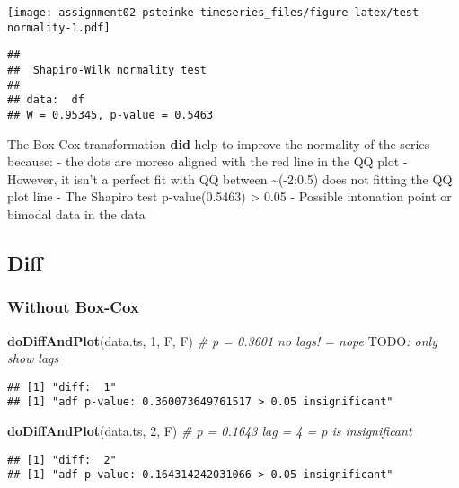 \documentclass[]{article}
\newenvironment{Shaded}{\begin{snugshade}}{\end{snugshade}}
\newcommand{\AlertTok}[1]{\textcolor[rgb]{0.94,0.16,0.16}{#1}}
\newcommand{\CommentTok}[1]{\textcolor[rgb]{0.56,0.35,0.01}{\textit{#1}}}
\newcommand{\DecValTok}[1]{\textcolor[rgb]{0.00,0.00,0.81}{#1}}
\newcommand{\KeywordTok}[1]{\textcolor[rgb]{0.13,0.29,0.53}{\textbf{#1}}}
\newcommand{\NormalTok}[1]{#1}
\begin{document}
\texttt{[image: assignment02-psteinke-timeseries\_files/figure-latex/test-normality-1.pdf]}

\begin{verbatim}
## 
##  Shapiro-Wilk normality test
## 
## data:  df
## W = 0.95345, p-value = 0.5463
\end{verbatim}

The Box-Cox transformation \textbf{did} help to improve the normality of
the series because: - the dots are moreso aligned with the red line in
the QQ plot - However, it isn't a perfect fit with QQ between
\textasciitilde(-2:0.5) does not fitting the QQ plot line - The Shapiro
test p-value(0.5463) \textgreater{} 0.05 - Possible intonation point or
bimodal data in the data

\hypertarget{diff}{%
\subsection{Diff}\label{diff}}

\hypertarget{without-box-cox}{%
\subsubsection{Without Box-Cox}\label{without-box-cox}}

\begin{Shaded}
\begin{Highlighting}[]
\KeywordTok{doDiffAndPlot}\NormalTok{(data.ts, }\DecValTok{1}\NormalTok{, F, F) }\CommentTok{# p = 0.3601 no lags! = nope }\AlertTok{TODO}\CommentTok{: only show lags}
\end{Highlighting}
\end{Shaded}

\begin{verbatim}
## [1] "diff:  1"
## [1] "adf p-value: 0.360073649761517 > 0.05 insignificant"
\end{verbatim}

\begin{Shaded}
\begin{Highlighting}[]
\KeywordTok{doDiffAndPlot}\NormalTok{(data.ts, }\DecValTok{2}\NormalTok{, F) }\CommentTok{# p = 0.1643 lag = 4 = p is insignificant}
\end{Highlighting}
\end{Shaded}

\begin{verbatim}
## [1] "diff:  2"
## [1] "adf p-value: 0.164314242031066 > 0.05 insignificant"
\end{verbatim}
\end{document}
